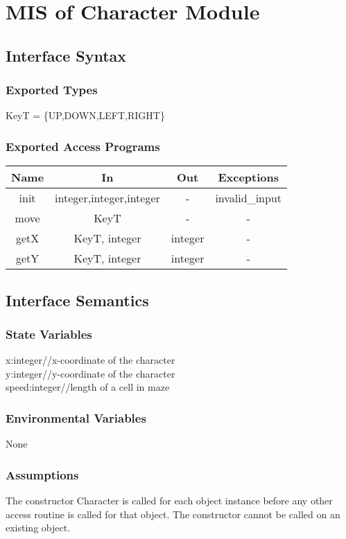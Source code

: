 \documentclass[12pt, titlepage]{article}
\begin{document}
\section{MIS of Character Module}
\subsection{Interface Syntax}
\subsubsection{Exported Types}
KeyT = \{UP,DOWN,LEFT,RIGHT\}
\subsubsection{Exported Access Programs}
\begin{tabular}[pos]{|c|c|c|c|}
\hline
\textbf{Name}& \textbf{In} & \textbf{Out} & \textbf{Exceptions} \\ \hline
 init&integer,integer,integer  &-  &invalid\_input \\ \hline
 move& KeyT & - &- \\ \hline
 getX& KeyT, integer & integer &- \\ \hline
 getY& KeyT, integer & integer &- \\ \hline
\end{tabular}
\subsection{Interface Semantics}
\subsubsection{State Variables}
x:integer//x-coordinate of the character\\
y:integer//y-coordinate of the character\\
speed:integer//length of a cell in maze
\subsubsection{Environmental Variables}
None
\subsubsection{Assumptions}
The constructor Character is called for each object instance before any other
access routine is called for that object.  The constructor cannot be called on
an existing object.
\end{document}
